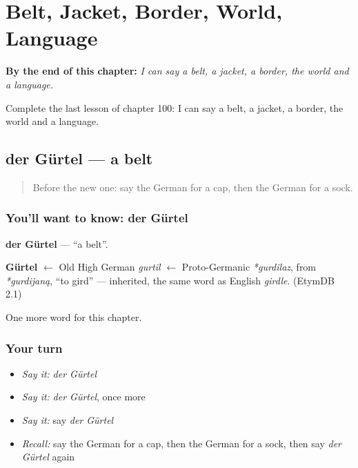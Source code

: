 
\chapter{Belt, Jacket, Border, World, Language}
\label{ch:ge-belt-jacket-border-world-language}

\begin{chapteropening}
\textbf{By the end of this chapter:} \emph{I can say a belt, a jacket, a border, the world and a language.}

Complete the last lesson of chapter 100: I can say a belt, a jacket, a border, the world and a language.
\end{chapteropening}

\section[der Gürtel]{der Gürtel — a belt}

\label{lesson:GE-C100-guertel}



\begin{quote}
Before the new one: say the German for a cap, then the German for a sock.
\end{quote}

\subsection*{You'll want to know: der Gürtel}
\textbf{der Gürtel} — \textquotedblleft{}a belt\textquotedblright{}.

\begin{cousinweb}
\textbf{Gürtel} $\leftarrow$ Old High German \emph{gurtil} $\leftarrow$ Proto-Germanic \emph{*gurdilaz}, from \emph{*gurdijaną}, \textquotedblleft{}to gird\textquotedblright{} — inherited, the same word as English \emph{girdle}. (EtymDB 2.1)
\end{cousinweb}

\begin{grammarlens}[title={What you've built}]
One more word for this chapter.
\end{grammarlens}

\subsection*{Your turn}
\begin{itemize}
\raggedright
  \item \emph{Say it:} \emph{der Gürtel}
  \item \emph{Say it:} \emph{der Gürtel}, once more
  \item \emph{Say it:} say \emph{der Gürtel}
  \item \emph{Recall:} say the German for a cap, then the German for a sock, then say \emph{der Gürtel} again
\end{itemize}

